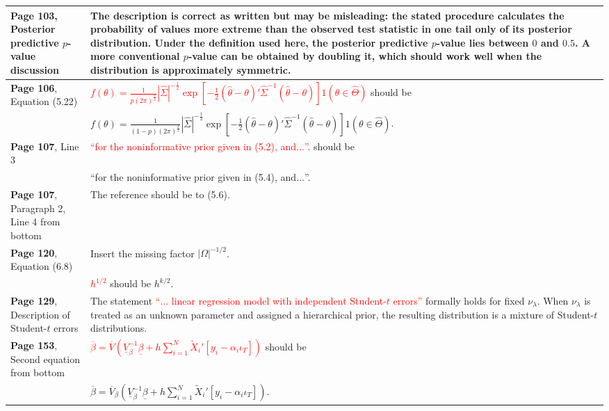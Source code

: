 \documentclass[10pt, a4paper]{article}
\newcommand{\red}[1]{\textcolor{red}{#1}}
\newcommand{\green}[1]{\textcolor{green!50!black}{#1}}
\begin{document}
\begin{longtable}{|R{.38\textwidth}|R{.58\textwidth}|}
	\textbf{Page 103}, Posterior predictive $p$-value discussion & The description is correct as written but may be misleading: the stated procedure calculates the probability of values more extreme than the observed test statistic in one tail only of its posterior distribution. Under the definition used here, the posterior predictive $p$-value lies between $0$ and $0.5$. A more conventional $p$-value can be obtained by doubling it, which should work well when the distribution is approximately symmetric. \\ \hline	
	\textbf{Page 106}, Equation (5.22) & \red{$\displaystyle f(\theta)=\frac{1}{p(2\pi)^{\frac{k}{2}}}|\widehat{\Sigma}|^{-\frac{1}{2}}\exp\left[-\frac{1}{2}(\widehat{\theta}-\theta)'\widehat{\Sigma}^{-1}(\widehat{\theta}-\theta)\right]1(\theta\in\widehat{\Theta})$} should be \\ 
	& \green{$\displaystyle f(\theta)=\frac{1}{(1-p)(2\pi)^{\frac{k}{2}}}|\widehat{\Sigma}|^{-\frac{1}{2}}\exp\left[-\frac{1}{2}(\widehat{\theta}-\theta)'\widehat{\Sigma}^{-1}(\widehat{\theta}-\theta)\right]1(\theta\in\widehat{\Theta})$}. \\ \hline	
	\textbf{Page 107}, Line 3 &  \red{``for the noninformative prior given in (5.2), and$\ldots$''}.  should be \\
	& \green{``for the noninformative prior given in (5.4), and$\ldots$''}. \\ \hline
	\textbf{Page 107}, Paragraph 2, Line 4 from bottom & The reference should be to \green{(5.6)}. \\ \hline	
	\textbf{Page 120}, Equation (6.8) & Insert the missing factor \green{$|\Omega|^{-1/2}$}. \\
	& \red{$h^{1/2}$} should be \green{$h^{k/2}$}. \\ \hline	
	\textbf{Page 129}, Description of Student-$t$ errors & The statement \red{``$\ldots$ linear regression model with independent Student-$t$ errors''} formally holds for fixed $\nu_\lambda$. When $\nu_\lambda$ is treated as an unknown parameter and assigned a hierarchical prior, the resulting distribution is a mixture of Student-$t$ distributions. \\ \hline	
	\textbf{Page 153}, Second equation from bottom &  \red{$\displaystyle \overline{\beta}=\overline{V} \left(\underline{V}_{\beta}^{-1}\underline{\beta}+h\sum_{i=1}^{N}\widetilde{X}_i'[y_i-\alpha_i\iota_T]\right)$} should be \\
	& \green{$\displaystyle \overline{\beta}=\overline{V}_{\beta}\left(\underline{V}_{\beta}^{-1}\underline{\beta}+h\sum_{i=1}^{N}\widetilde{X}_i'[y_i-\alpha_i\iota_T]\right)$}. \\ \hline	

\end{longtable}
\end{document}
